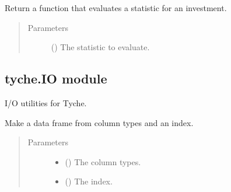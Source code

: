 \documentclass[letterpaper,10pt,english]{sphinxmanual}
\begin{document}
\begin{fulllineitems}
\begin{fulllineitems}
\label{\detokenize{tyche:tyche.Evaluator.Evaluator.make_statistic_evaluator}}
Return a function that evaluates a statistic for an investment.
\begin{quote}\begin{description}
\item[{Parameters}] \leavevmode
{} () \textendash{} The statistic to evaluate.

\end{description}\end{quote}

\end{fulllineitems}


\end{fulllineitems}



\subsection{tyche.IO module}
\label{\detokenize{tyche:module-tyche.IO}}\label{\detokenize{tyche:tyche-io-module}}
I/O utilities for Tyche.

\begin{fulllineitems}
\label{\detokenize{tyche:tyche.IO.make_table}}
Make a data frame from column types and an index.
\begin{quote}\begin{description}
\item[{Parameters}] \leavevmode\begin{itemize}
\item {} 
 () \textendash{} The column types.

\item {} 
 () \textendash{} The index.

\end{itemize}

\end{description}\end{quote}

\end{fulllineitems}
\end{document}
